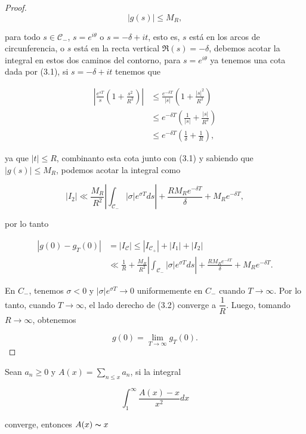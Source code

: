 \begin{proof}
$$|g(s)|\leq M_R,$$

para todo $s \in \mathscr{C}_-$, $s=e^{i\theta}$ o $s=-\delta+it$, esto es, $s$ está en los arcos de circunferencia, o $s$ está en la recta vertical $\Re(s)=-\delta$, debemos acotar la integral en estos dos caminos del contorno, para $s=e^{i\theta}$ ya tenemos una cota dada por (3.1), si $s=-\delta+it$ tenemos que

\begin{align*}
    \left|\frac{e^{s T}}{s}\left(1+\frac{s^2}{R^2}\right)\right|&\leq \frac{e^{-\delta T}}{|s|}\left(1+\frac{|s|^2}{R^2}\right)\\
    &\leq e^{-\delta T}\left(\frac{1}{|s|}+\frac{|s|}{R^2}\right)\\
    &\leq e^{-\delta T}\left(\frac{1}{\delta}+\frac{1}{R}\right)
,\end{align*}

ya que $|t|\leq R$, combinanto esta cota junto con (3.1) y sabiendo que $|g(s)|\leq M_R$, podemos acotar la integral como

$$|I_2|\ll \frac{M_R}{R^2}\left|\int_{\mathscr{C}_-} |\sigma|e^{\sigma T} d s\right|+\frac{R M_R e^{-\delta T}}{\delta}+M_R e^{-\delta T},$$


por lo tanto

\begin{equation}
    \begin{aligned}
    |g(0)-g_T(0)|&=|I_{\mathscr{C}}|\leq |I_{\mathscr{C}_+}|+|I_1|+|I_2|\\
    &\ll \frac{1}{R}+\frac{M_R}{R^2}\left|\int_{\mathscr{C}_-} |\sigma|e^{\sigma T} d s\right|+\frac{R M_R e^{-\delta T}}{\delta}+M_R e^{-\delta T}
.\end{aligned}
\end{equation}

En \( C_{-} \), tenemos \( \sigma < 0 \) y \( |\sigma| e^{\sigma T} \rightarrow 0 \) uniformemente en \( C_{-} \) cuando \( T \rightarrow \infty \). Por lo tanto, cuando \( T \rightarrow \infty \), el lado derecho de (3.2) converge a \( \dfrac{1}{R} \). Luego, tomando \( R \rightarrow \infty \), obtenemos 

\[
g(0) = \lim _{T \rightarrow \infty} g_T(0).
\]
\end{proof}

\begin{lemma}

Sean $a_n\geq 0$ y $A(x)=\displaystyle\sum_{n\leq x} a_n$, si  la integral

$$\int_1^{\infty}\frac{A(x)-x}{x^2}dx$$

converge, entonces $A(x)\thicksim x$

\end{lemma}

